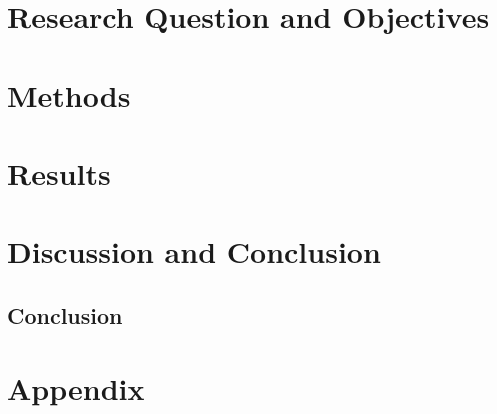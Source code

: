 \documentclass[12pt]{report}
\numberwithin{figure}{chapter}
\begin{document}
\chapter{Research Question and Objectives}


\chapter{Methods}



\chapter{Results}


\chapter{Discussion and Conclusion}

\section{Conclusion}




\newpage
{}
{}




\chapter*{Appendix}

\end{document}
